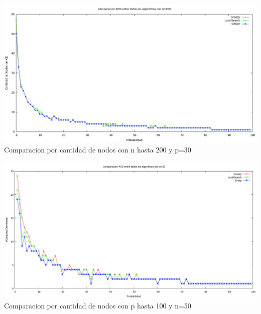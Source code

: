 
\begin{center}
\includegraphics[width=17cm]{./graficos/comparacioncantCDprobvariablen200.png}\\
Comparacion por cantidad de nodos con n hasta 200 y p=30
\end{center}




\begin{center}
\includegraphics[width=17cm]{./graficos/comparacioncantCDprobvariablen50.png}\\
Comparacion por cantidad de nodos con p hasta 100 y n=50
\end{center}


